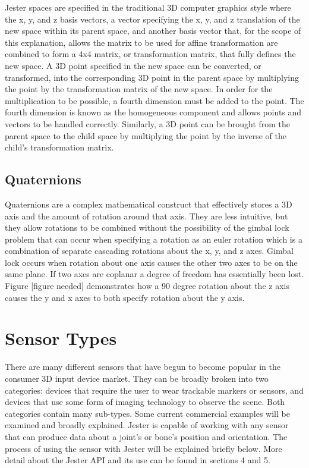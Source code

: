 Jester spaces are specified in the traditional 3D computer graphics style where the x, y, and z basis vectors, a vector specifying the x, y, and z translation of the new space within its parent space, and another basis vector that, for the scope of this explanation, allows the matrix to be used for affine transformation are combined to form a 4x4 matrix, or transformation matrix, that fully defines the new space. A 3D point specified in the new space can be converted, or transformed, into the corresponding 3D point in the parent space by multiplying the point by the transformation matrix of the new space. In order for the multiplication to be possible, a fourth dimension must be added to the point. The fourth dimension is known as the homogeneous component and allows points and vectors to be handled correctly. Similarly, a 3D point can be brought from the parent space to the child space by multiplying the point by the inverse of the child’s transformation matrix.

\subsection{Quaternions}

Quaternions are a complex mathematical construct that effectively stores a 3D axis and the amount of rotation around that axis. They are less intuitive, but they allow rotations to be combined without the possibility of the gimbal lock problem that can occur when specifying a rotation as an euler rotation which is a combination of separate cascading rotations about the x, y, and z axes. Gimbal lock occurs when rotation about one axis causes the other two axes to be on the same plane. If two axes are coplanar a degree of freedom has essentially been lost. Figure [figure needed] demonstrates how a 90 degree rotation about the z axis causes the y and x axes to both specify rotation about the y axis.

\section{Sensor Types}

There are many different sensors that have begun to become popular in the consumer 3D input device market. They can be broadly broken into two categories: devices that require the user to wear trackable markers or sensors, and devices that use some form of imaging technology to observe the scene. Both categories contain many sub-types. Some current commercial examples will be examined and broadly explained. Jester is capable of working with any sensor that can produce data about a joint’s or bone’s position and orientation. The process of using the sensor with Jester will be explained briefly below. More detail about the Jester API and its use can be found in sections 4 and 5. 

